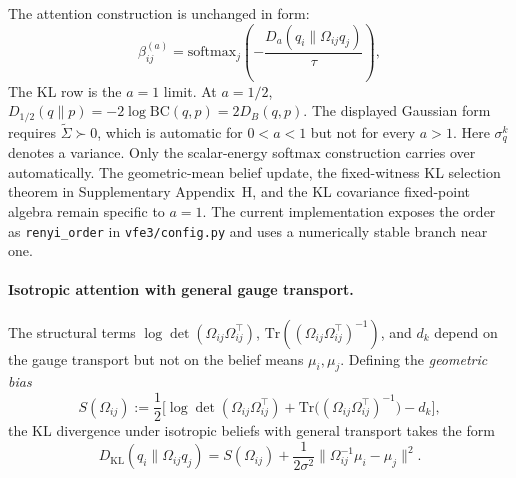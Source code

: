 \documentclass[twoside,11pt]{article}
\begin{document}
The attention construction is unchanged in form:
\begin{equation}
\beta_{ij}^{(a)} = \mathrm{softmax}_j\left(-\frac{D_a(q_i \| \Omega_{ij} q_j)}{\tau}\right),
\label{eq:renyi_attention}
\end{equation}
The KL row is the $a=1$ limit. At $a=1/2$, $D_{1/2}(q\|p)=-2\log\mathrm{BC}(q,p)=2D_B(q,p)$. The displayed Gaussian form requires $\tilde\Sigma\succ0$, which is automatic for $0<a<1$ but not for every $a>1$. Here $\sigma_q^k$ denotes a variance. Only the scalar-energy softmax construction carries over automatically. The geometric-mean belief update, the fixed-witness KL selection theorem in Supplementary Appendix~H, and the KL covariance fixed-point algebra remain specific to $a=1$. The current implementation exposes the order as \texttt{renyi\_order} in \texttt{vfe3/config.py} and uses a numerically stable branch near one.

\paragraph{Isotropic attention with general gauge transport.}

The structural terms $\log\det(\Omega_{ij}\Omega_{ij}^\top)$, $\mathrm{Tr}((\Omega_{ij}\Omega_{ij}^\top)^{-1})$, and $d_k$ depend on the gauge transport but not on the belief means $\mu_i, \mu_j$. Defining the \emph{geometric bias}
\begin{equation}
S(\Omega_{ij}) := \frac{1}{2}\Big[\log\det(\Omega_{ij}\Omega_{ij}^\top) + \mathrm{Tr}\big((\Omega_{ij}\Omega_{ij}^\top)^{-1}\big) - d_k\Big],
\label{eq:geometric_bias}
\end{equation}
the KL divergence under isotropic beliefs with general transport takes the form
\begin{equation}
D_{\mathrm{KL}}(q_i \| \Omega_{ij} q_j) = S(\Omega_{ij}) + \frac{1}{2\sigma^2}\|\Omega_{ij}^{-1}\mu_i - \mu_j\|^2.
\label{eq:isotropic_general_omega}
\end{equation}
\end{document}
